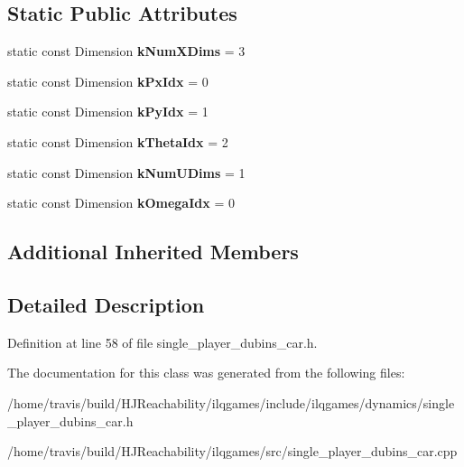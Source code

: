 \subsection*{Static Public Attributes}
\begin{DoxyCompactItemize}
\item 
static const Dimension {\bfseries k\+Num\+X\+Dims} = 3\hypertarget{classilqgames_1_1_single_player_dubins_car_a8c5f6a8a06b4bdefbd9a56c7a5bbd193}{}\label{classilqgames_1_1_single_player_dubins_car_a8c5f6a8a06b4bdefbd9a56c7a5bbd193}

\item 
static const Dimension {\bfseries k\+Px\+Idx} = 0\hypertarget{classilqgames_1_1_single_player_dubins_car_aa804a3752e51f8bb5b72fd9aeb8be36f}{}\label{classilqgames_1_1_single_player_dubins_car_aa804a3752e51f8bb5b72fd9aeb8be36f}

\item 
static const Dimension {\bfseries k\+Py\+Idx} = 1\hypertarget{classilqgames_1_1_single_player_dubins_car_aa1d26063db82735de0b9cace00b7b53a}{}\label{classilqgames_1_1_single_player_dubins_car_aa1d26063db82735de0b9cace00b7b53a}

\item 
static const Dimension {\bfseries k\+Theta\+Idx} = 2\hypertarget{classilqgames_1_1_single_player_dubins_car_a4a7244d2b430f62e6c993e01a0a54a44}{}\label{classilqgames_1_1_single_player_dubins_car_a4a7244d2b430f62e6c993e01a0a54a44}

\item 
static const Dimension {\bfseries k\+Num\+U\+Dims} = 1\hypertarget{classilqgames_1_1_single_player_dubins_car_a2751da81d773417cb83d66ade7f55224}{}\label{classilqgames_1_1_single_player_dubins_car_a2751da81d773417cb83d66ade7f55224}

\item 
static const Dimension {\bfseries k\+Omega\+Idx} = 0\hypertarget{classilqgames_1_1_single_player_dubins_car_aa25171fab5c33ce524c67bf891916dde}{}\label{classilqgames_1_1_single_player_dubins_car_aa25171fab5c33ce524c67bf891916dde}

\end{DoxyCompactItemize}
\subsection*{Additional Inherited Members}


\subsection{Detailed Description}


Definition at line 58 of file single\+\_\+player\+\_\+dubins\+\_\+car.\+h.



The documentation for this class was generated from the following files\+:\begin{DoxyCompactItemize}
\item 
/home/travis/build/\+H\+J\+Reachability/ilqgames/include/ilqgames/dynamics/single\+\_\+player\+\_\+dubins\+\_\+car.\+h\item 
/home/travis/build/\+H\+J\+Reachability/ilqgames/src/single\+\_\+player\+\_\+dubins\+\_\+car.\+cpp\end{DoxyCompactItemize}
